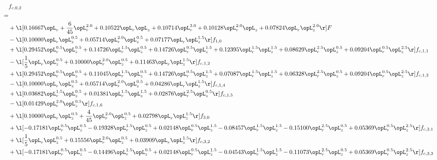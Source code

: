 \begin{alignat}{2} 
\label{eq:f_02_2} 
& f_{c,0,2} \nonumber \\ 
 = \\ 
& + \l[  0.16667 \opL_r + \frac{6}{45} \opL_r^{2.0} +  0.10522 \opL_r \opL_z +  0.10714 \opL_r^{3.0} +  0.10128 \opL_r^{2.0} \opL_z +  0.07824 \opL_r \opL_z^{2.0}  \r] F \nonumber \\ 
& - \l[  0.10000 \opL_r \opL_z^{0.5} +  0.05714 \opL_r^{2.0} \opL_z^{0.5} +  0.07177 \opL_r \opL_z^{1.5}  \r] f_{1,0} \nonumber \\ 
& + \l[  0.29452 \opL_r^{0.5} \opL_z^{0.5} +  0.14726 \opL_r^{1.5} \opL_z^{0.5} +  0.14726 \opL_r^{0.5} \opL_z^{1.5} +  0.12395 \opL_r^{1.5} \opL_z^{1.5} +  0.08629 \opL_r^{2.5} \opL_z^{0.5} +  0.09204 \opL_r^{0.5} \opL_z^{2.5}  \r] f_{c,1,1} \nonumber \\ 
& - \l[ \frac{1}{5} \opL_r \opL_z^{0.5} +  0.10000 \opL_r^{2.0} \opL_z^{0.5} +  0.11463 \opL_r \opL_z^{1.5}  \r] f_{c,1,2} \nonumber \\ 
& + \l[  0.29452 \opL_r^{0.5} \opL_z^{0.5} +  0.11045 \opL_r^{1.5} \opL_z^{0.5} +  0.14726 \opL_r^{0.5} \opL_z^{1.5} +  0.07087 \opL_r^{1.5} \opL_z^{1.5} +  0.06328 \opL_r^{2.5} \opL_z^{0.5} +  0.09204 \opL_r^{0.5} \opL_z^{2.5}  \r] f_{c,1,3} \nonumber \\ 
& - \l[  0.10000 \opL_r \opL_z^{0.5} +  0.05714 \opL_r^{2.0} \opL_z^{0.5} +  0.04286 \opL_r \opL_z^{1.5}  \r] f_{c,1,4} \nonumber \\ 
& + \l[  0.03682 \opL_r^{1.5} \opL_z^{0.5} +  0.01381 \opL_r^{1.5} \opL_z^{1.5} +  0.02876 \opL_r^{2.5} \opL_z^{0.5}  \r] f_{c,1,5} \nonumber \\ 
& - \l[  0.01429 \opL_r^{2.0} \opL_z^{0.5}  \r] f_{c,1,6} \nonumber \\ 
& + \l[  0.10000 \opL_r \opL_z^{0.5} + \frac{4}{45} \opL_r^{2.0} \opL_z^{0.5} +  0.02798 \opL_r \opL_z^{1.5}  \r] f_{3,0} \nonumber \\ 
& + \l[  -0.17181 \opL_r^{0.5} \opL_z^{0.5}   -0.19328 \opL_r^{1.5} \opL_z^{0.5} +  0.02148 \opL_r^{0.5} \opL_z^{1.5}   -0.08457 \opL_r^{1.5} \opL_z^{1.5}   -0.15100 \opL_r^{2.5} \opL_z^{0.5} +  0.05369 \opL_r^{0.5} \opL_z^{2.5}  \r] f_{c,3,1} \nonumber \\ 
& + \l[ \frac{1}{5} \opL_r \opL_z^{0.5} +  0.15556 \opL_r^{2.0} \opL_z^{0.5} +  0.03909 \opL_r \opL_z^{1.5}  \r] f_{c,3,2} \nonumber \\ 
& + \l[  -0.17181 \opL_r^{0.5} \opL_z^{0.5}   -0.14496 \opL_r^{1.5} \opL_z^{0.5} +  0.02148 \opL_r^{0.5} \opL_z^{1.5}   -0.04543 \opL_r^{1.5} \opL_z^{1.5}   -0.11073 \opL_r^{2.5} \opL_z^{0.5} +  0.05369 \opL_r^{0.5} \opL_z^{2.5}  \r] f_{c,3,3} \nonumber \\ 

\end{alignat}
